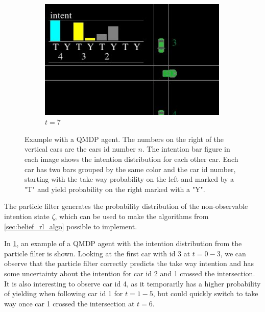 \begin{figure}[!t]
\begin{subfigure}[b]{0.24\textwidth}
         \includegraphics[width=0.99\textwidth]{figures/intent_distribution/screenshot_9.jpeg}
         \caption{$t=7$}
     \end{subfigure}
     
    \centering
        \caption{Example with a QMDP agent. 
        The numbers on the right of the vertical cars are the cars id number $n$. The intention bar figure in each image shows the intention distribution for each other car. Each car has two bars grouped by the same color and the car id number, starting with the take way probability on the left and marked by a "T" and yield probability on the right marked with a "Y".}
    \label{fig:qmdp_screenshot}
\end{figure}
The particle filter generates the probability distribution of the non-observable intention state $\zeta$, which can be used to make the algorithms from \ref{sec:belief_rl_algo} possible to implement. 

In \ref{fig:qmdp_screenshot}, an example of a QMDP agent with the intention distribution from the particle filter is shown. Looking at the first car with id 3 at $t=0-3$, we can observe that the particle filter correctly predicts the take way intention and has some uncertainty about the intention for car id 2 and 1 crossed the intersection. 
It is also interesting to observe car id 4, as it temporarily has a higher probability of yielding when following car id 1 for $t=1-5$, but could quickly switch to take way once car 1 crossed the intersection at $t=6$. 

